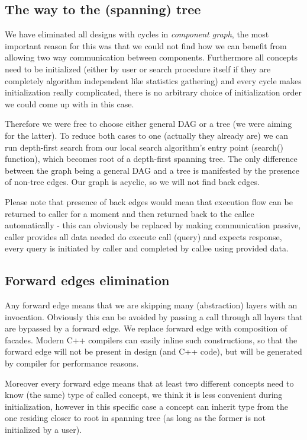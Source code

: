 \subsection{The way to the (spanning) tree}
We have eliminated all designs with cycles in \emph{component graph}, the most
important reason for this was that we could not find how we can benefit from
allowing two way communication between components. Furthermore all concepts
need to be initialized (either by user or search procedure itself if they are
completely algorithm independent like statistics gathering) and every cycle
makes initialization really complicated, there is no arbitrary choice of
initialization order we could come up with in this case.

Therefore we were free to choose either general DAG or a tree (we were aiming
for the latter). To reduce both cases to one (actually they already are) we can
run depth-first search from our local search algorithm's entry point (search()
function), which becomes root of a depth-first spanning tree. The only
difference between the graph being a general DAG and a tree is manifested by
the presence of non-tree edges. Our graph is acyclic, so we will not find back
edges.

Please note that presence of back edges would mean that execution flow can be
returned to caller for a moment and then returned back to the callee
automatically - this can obviously be replaced by making communication
passive, caller provides all data needed do execute call (query) and expects
response, every query is initiated by caller and completed by callee using
provided data.

\subsection{Forward edges elimination}
Any forward edge means that we are skipping many (abstraction) layers with an
invocation. Obviously this can be avoided by passing a call through all layers
that are bypassed by a forward edge. We replace forward edge with composition
of facades. Modern C++ compilers can easily inline such constructions, so that
the forward edge will not be present in design (and C++ code), but will be
generated by compiler for performance reasons.

Moreover every forward edge means that at least two different concepts need to
know (the same) type of called concept, we think it is less convenient during
initialization, however in this specific case a concept can inherit type from
the one residing closer to root in spanning tree (as long as the former is not
initialized by a user).

